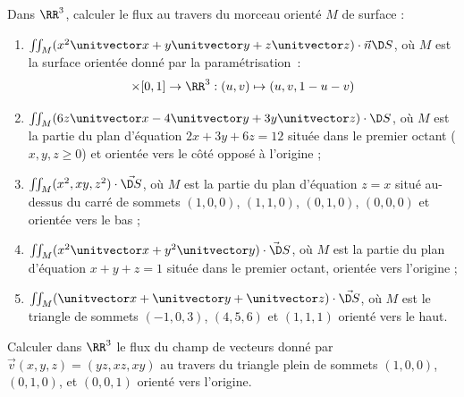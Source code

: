 \documentclass[12pt,french,oneside,a4paper]{memoir} %
\begin{document}
\begin{exo}
Dans $\RR^{3}$, calculer le flux au travers du morceau orienté $M$ de surface :
\begin{enumerate}
\item $\iint_M (x^2 \unitvector x + y \unitvector y + z \unitvector z) \cdot \vec n \D S$, où $M$ est la surface orientée donné par la paramétrisation~:
  \begin{equation*}
    [0,1]\times[0,1] \to \RR^{3} : (u,v) \mapsto (u,v,1-u-v)
  \end{equation*}
\item $\iint_{M} (6 z \unitvector x - 4 \unitvector y + 3 y \unitvector z) \cdot \D S$, où $M$ est la partie du plan d'équation $2x + 3y + 6z = 12$ située dans le premier octant ($x,y,z \geq 0$) et orientée vers le côté opposé à l'origine ;
\item $\iint_{M} (x^{2},xy,z^{2})\cdot \vec{\D S}$, où $M$ est la partie du plan d'équation $z = x$ situé au-dessus du carré de sommets $(1,0,0)$, $(1,1,0)$, $(0,1,0)$, $(0,0,0)$ et orientée vers le bas ;
\item $\iint_{M} (x^{2} \unitvector x + y^{2} \unitvector y)\cdot \vec  \D S$, où $M$ est la partie du plan d'équation $x + y + z = 1$ située dans le premier octant, orientée vers l'origine ;
\item $\iint_{M} (\unitvector x + \unitvector y + \unitvector z) \cdot \vec{\D S}$, où $M$ est le triangle de sommets $(-1,0,3)$, $(4,5,6)$ et $(1,1,1)$ orienté vers le haut.
\end{enumerate}
\end{exo}

\begin{exo}
Calculer dans $\RR^{3}$ le flux du champ de vecteurs donné par $\vec v (x,y,z) = (yz,xz,xy)$ au travers du triangle plein de sommets $(1,0,0)$, $(0,1,0)$, et $(0,0,1)$ orienté vers l'origine.
\end{exo}
\end{document}
